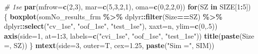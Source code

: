 \documentclass[
]{book}
\newenvironment{Shaded}{\begin{snugshade}}{\end{snugshade}}
\newcommand{\CommentTok}[1]{\textcolor[rgb]{0.56,0.35,0.01}{\textit{#1}}}
\newcommand{\ControlFlowTok}[1]{\textcolor[rgb]{0.13,0.29,0.53}{\textbf{#1}}}
\newcommand{\DataTypeTok}[1]{\textcolor[rgb]{0.13,0.29,0.53}{#1}}
\newcommand{\DecValTok}[1]{\textcolor[rgb]{0.00,0.00,0.81}{#1}}
\newcommand{\FloatTok}[1]{\textcolor[rgb]{0.00,0.00,0.81}{#1}}
\newcommand{\KeywordTok}[1]{\textcolor[rgb]{0.13,0.29,0.53}{\textbf{#1}}}
\newcommand{\NormalTok}[1]{#1}
\newcommand{\OperatorTok}[1]{\textcolor[rgb]{0.81,0.36,0.00}{\textbf{#1}}}
\newcommand{\StringTok}[1]{\textcolor[rgb]{0.31,0.60,0.02}{#1}}
\begin{document}
\begin{Shaded}
\begin{Highlighting}[]
\CommentTok{\# 1se}
\KeywordTok{par}\NormalTok{(}\DataTypeTok{mfrow=}\KeywordTok{c}\NormalTok{(}\DecValTok{2}\NormalTok{,}\DecValTok{3}\NormalTok{), }\DataTypeTok{mar=}\KeywordTok{c}\NormalTok{(}\DecValTok{5}\NormalTok{,}\DecValTok{3}\NormalTok{,}\DecValTok{2}\NormalTok{,}\DecValTok{1}\NormalTok{), }\DataTypeTok{oma=}\KeywordTok{c}\NormalTok{(}\DecValTok{0}\NormalTok{,}\DecValTok{2}\NormalTok{,}\DecValTok{2}\NormalTok{,}\DecValTok{0}\NormalTok{))}
\ControlFlowTok{for}\NormalTok{(SZ }\ControlFlowTok{in}\NormalTok{ SIZE[}\DecValTok{1}\OperatorTok{:}\DecValTok{5}\NormalTok{]) \{}
  \KeywordTok{boxplot}\NormalTok{(somNo\_results\_frm }\OperatorTok{\%>\%}\StringTok{ }\NormalTok{dplyr}\OperatorTok{::}\KeywordTok{filter}\NormalTok{(Size}\OperatorTok{==}\NormalTok{SZ) }
    \OperatorTok{\%>\%}\StringTok{ }\NormalTok{dplyr}\OperatorTok{::}\KeywordTok{select}\NormalTok{(}\StringTok{"cv\_1se"}\NormalTok{, }\StringTok{"oof\_1se"}\NormalTok{, }\StringTok{"test\_1se"}\NormalTok{),}
    \DataTypeTok{xaxt=}\StringTok{\textquotesingle{}n\textquotesingle{}}\NormalTok{, }\DataTypeTok{ylim=}\KeywordTok{c}\NormalTok{(}\DecValTok{0}\NormalTok{,.}\DecValTok{5}\NormalTok{))}
   \KeywordTok{axis}\NormalTok{(}\DataTypeTok{side=}\DecValTok{1}\NormalTok{, }\DataTypeTok{at=}\DecValTok{1}\OperatorTok{:}\DecValTok{3}\NormalTok{, }\DataTypeTok{labels=}\KeywordTok{c}\NormalTok{(}\StringTok{"cvi\_1se"}\NormalTok{, }\StringTok{"oof\_1se"}\NormalTok{, }\StringTok{"test\_1se"}\NormalTok{))}
   \KeywordTok{title}\NormalTok{(}\KeywordTok{paste}\NormalTok{(}\StringTok{\textquotesingle{}Size =\textquotesingle{}}\NormalTok{, SZ))}
\NormalTok{\}}
\KeywordTok{mtext}\NormalTok{(}\DataTypeTok{side=}\DecValTok{3}\NormalTok{, }\DataTypeTok{outer=}\NormalTok{T, }\DataTypeTok{cex=}\FloatTok{1.25}\NormalTok{, }\KeywordTok{paste}\NormalTok{(}\StringTok{"Sim ="}\NormalTok{, SIM))}


\end{Highlighting}
\end{Shaded}
\end{document}
